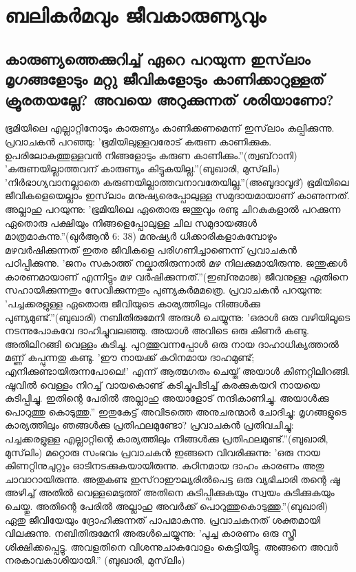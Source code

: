 \chapter{ബലികര്‍മവും ജീവകാരുണ്യവും }
  \section{കാരുണ്യത്തെക്കുറിച്ച് ഏറെ പറയുന്ന ഇസ്‌ലാം മൃഗങ്ങളോടും മറ്റു ജീവികളോടും കാണിക്കാറുള്ളത് ക്രൂരതയല്ലേ? അവയെ അറുക്കുന്നത് ശരിയാണോ?}
    
ഭൂമിയിലെ എല്ലാറ്റിനോടും കാരുണ്യം കാണിക്കണമെന്ന് ഇസ്‌ലാം കല്പിക്കുന്നു. പ്രവാചകന്‍ പറഞ്ഞു: 'ഭൂമിയിലുള്ളവരോട് കരുണ കാണിക്കുക. ഉപരിലോകത്തുള്ളവന്‍ നിങ്ങളോടും കരുണ കാണിക്കും.''(ത്വബ്‌റാനി)
'കരുണയില്ലാത്തവന് കാരുണ്യം കിട്ടുകയില്ല.''(ബുഖാരി, മുസ്‌ലിം)
'നിര്‍ഭാഗ്യവാനല്ലാതെ കരുണയില്ലാത്തവനാവതേയില്ല.''(അബൂദാവൂദ്)
ഭൂമിയിലെ ജീവികളെയെല്ലാം ഇസ്‌ലാം മനുഷ്യരെപ്പോലുള്ള സമുദായമായാണ് കാണുന്നത്. അല്ലാഹു പറയുന്നു: 'ഭൂമിയിലെ ഏതൊരു ജന്തുവും രണ്ടു ചിറകുകളാല്‍ പറക്കുന്ന ഏതൊരു പക്ഷിയും നിങ്ങളെപ്പോലുള്ള ചില സമുദായങ്ങള്‍ മാത്രമാകുന്നു.''(ഖുര്‍ആന്‍ 6: 38)
മനുഷ്യര്‍ ധിക്കാരികളാകുമ്പോഴും മഴവര്‍ഷിക്കുന്നത് ഇതര ജീവികളെ പരിഗണിച്ചാണെന്ന് പ്രവാചകന്‍ പഠിപ്പിക്കുന്നു. 'ജനം സകാത്ത് നല്കാതിരുന്നാല്‍ മഴ നിലക്കുമായിരുന്നു. ജന്തുക്കള്‍ കാരണമായാണ് എന്നിട്ടും മഴ വര്‍ഷിക്കുന്നത്.''(ഇബ്‌നുമാജ)
ജീവനുള്ള ഏതിനെ സഹായിക്കുന്നതും സേവിക്കുന്നതും പുണ്യകര്‍മമത്രെ. പ്രവാചകന്‍ പറയുന്നു: 'പച്ചക്കരളുള്ള ഏതൊരു ജീവിയുടെ കാര്യത്തിലും നിങ്ങള്‍ക്കു പുണ്യമുണ്ട്.''(ബുഖാരി)
നബിതിരുമേനി അരുള്‍ ചെയ്യുന്നു: 'ഒരാള്‍ ഒരു വഴിയിലൂടെ നടന്നുപോകവേ ദാഹിച്ചുവലഞ്ഞു. അയാള്‍ അവിടെ ഒരു കിണര്‍ കണ്ടു. അതിലിറങ്ങി വെള്ളം കുടിച്ചു. പുറത്തുവന്നപ്പോള്‍ ഒരു നായ ദാഹാധിക്യത്താല്‍ മണ്ണ് കപ്പുന്നതു കണ്ടു. 'ഈ നായക്ക് കഠിനമായ ദാഹമുണ്ട്; എനിക്കുണ്ടായിരുന്നപോലെ!' എന്ന് ആത്മഗതം ചെയ്ത് അയാള്‍ കിണറ്റിലിറങ്ങി. ഷൂവില്‍ വെള്ളം നിറച്ച് വായകൊണ്ട് കടിച്ചുപിടിച്ച് കരക്കുകയറി നായയെ കുടിപ്പിച്ചു. ഇതിന്റെ പേരില്‍ അല്ലാഹു അയാളോട് നന്ദികാണിച്ചു. അയാള്‍ക്കു പൊറുത്തു കൊടുത്തു.'' ഇതുകേട്ട് അവിടത്തെ അനുചരന്മാര്‍ ചോദിച്ചു: മൃഗങ്ങളുടെ കാര്യത്തിലും ഞങ്ങള്‍ക്കു പ്രതിഫലമുണ്ടോ? പ്രവാചകന്‍ പ്രതിവചിച്ചു: പച്ചക്കരളുള്ള എല്ലാറ്റിന്റെ കാര്യത്തിലും നിങ്ങള്‍ക്കു പ്രതിഫലമുണ്ട്.''(ബുഖാരി, മുസ്‌ലിം)
മറ്റൊരു സംഭവം പ്രവാചകന്‍ ഇങ്ങനെ വിവരിക്കുന്നു: 'ഒരു നായ കിണറ്റിനുചുറ്റും ഓടിനടക്കുകയായിരുന്നു. കഠിനമായ ദാഹം കാരണം അതു ചാവാറായിരുന്നു. അതുകണ്ട ഇസ്‌റാഈല്യരില്‍പെട്ട ഒരു വ്യഭിചാരി തന്റെ ഷൂ അഴിച്ച് അതില്‍ വെള്ളമെടുത്ത് അതിനെ കുടിപ്പിക്കുകയും സ്വയം കുടിക്കുകയും ചെയ്തു. അതിന്റെ പേരില്‍ അല്ലാഹു അവര്‍ക്ക് പൊറുത്തുകൊടുത്തു.''(ബുഖാരി)
ഏതു ജീവിയേയും ദ്രോഹിക്കുന്നത് പാപമാകുന്നു. പ്രവാചകനത് ശക്തമായി വിലക്കുന്നു. നബിതിരുമേനി അരുള്‍ചെയ്യുന്നു: 'പൂച്ച കാരണം ഒരു സ്ത്രീ ശിക്ഷിക്കപ്പെട്ടു. അവളതിനെ വിശന്നുചാകുവോളം കെട്ടിയിട്ടു. അങ്ങനെ അവര്‍ നരകാവകാശിയായി.'' (ബുഖാരി, മുസ്‌ലിം)
